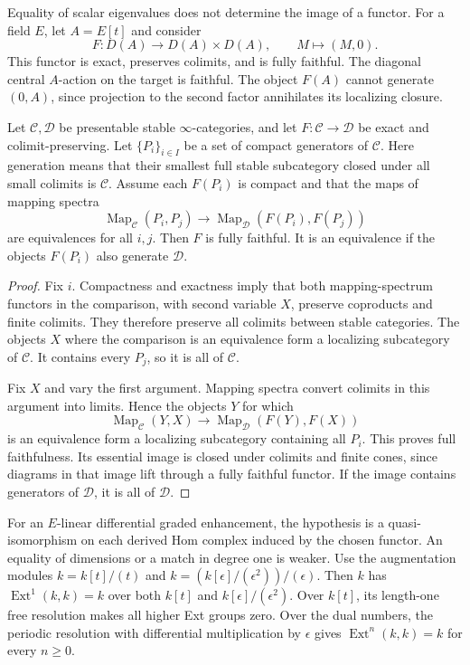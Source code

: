 Equality of scalar eigenvalues does not determine the image of a
functor. For a field $E$, let $A=E[t]$ and consider
\[
 F:D(A)\longrightarrow D(A)\times D(A),\qquad M\longmapsto(M,0).
\]
This functor is exact, preserves colimits, and is fully faithful.
The diagonal central $A$-action on the target is faithful.
The object $F(A)$ cannot generate $(0,A)$, since projection to the
second factor annihilates its localizing closure.

\begin{theorem}
\label{v4-arith:w5-e:local:generator-criterion}
Let $\mathcal C,\mathcal D$ be presentable stable
$\infty$-categories, and let $F:\mathcal C\to\mathcal D$ be exact
and colimit-preserving. Let $\{P_i\}_{i\in I}$ be a set of compact
generators of $\mathcal C$.
Here generation means that their smallest full stable subcategory
closed under all small colimits is $\mathcal C$.
Assume each $F(P_i)$ is compact and that the maps of mapping spectra
\[
 \operatorname{Map}_{\mathcal C}(P_i,P_j)
 \longrightarrow
 \operatorname{Map}_{\mathcal D}(F(P_i),F(P_j))
\]
are equivalences for all $i,j$. Then $F$ is fully faithful.
It is an equivalence if the objects $F(P_i)$ also generate
$\mathcal D$.
\end{theorem}

\begin{proof}
Fix $i$. Compactness and exactness imply that both mapping-spectrum
functors in the comparison, with second variable $X$, preserve
coproducts and finite colimits. They therefore preserve all colimits
between stable categories. The objects $X$ where the comparison is an
equivalence form a localizing subcategory of $\mathcal C$.
It contains every $P_j$, so it is all of $\mathcal C$.

Fix $X$ and vary the first argument. Mapping spectra convert colimits
in this argument into limits. Hence the objects $Y$ for which
\[
 \operatorname{Map}_{\mathcal C}(Y,X)
 \longrightarrow\operatorname{Map}_{\mathcal D}(F(Y),F(X))
\]
is an equivalence form a localizing subcategory containing all $P_i$.
This proves full faithfulness. Its essential image is closed under
colimits and finite cones, since diagrams in that image lift through
a fully faithful functor. If the image contains generators of
$\mathcal D$, it is all of $\mathcal D$.
\end{proof}

For an $E$-linear differential graded enhancement, the hypothesis is a
quasi-isomorphism on each derived Hom complex induced by the chosen
functor. An equality of dimensions or a match in degree one is weaker.
Use the augmentation modules $k=k[t]/(t)$ and
$k=(k[\epsilon]/(\epsilon^2))/(\epsilon)$. Then $k$ has
$\operatorname{Ext}^1(k,k)=k$ over both $k[t]$ and
$k[\epsilon]/(\epsilon^2)$. Over $k[t]$, its length-one free resolution
makes all higher Ext groups zero. Over the dual numbers, the periodic
resolution with differential multiplication by $\epsilon$ gives
$\operatorname{Ext}^n(k,k)=k$ for every $n\ge0$.

